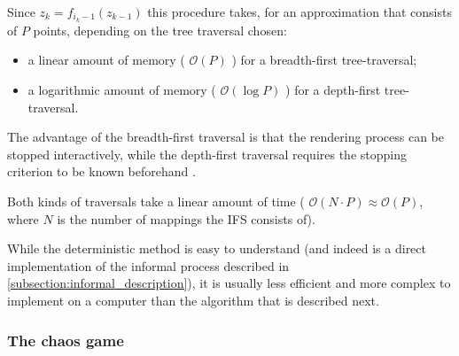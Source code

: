 \documentclass[11pt]{article}
\begin{document}
Since \(z_{k} = f_{i_k-1}(z_{k-1})\) this procedure takes, for an approximation that consists of \(P\) points, depending on the tree traversal chosen:

\begin{itemize}
\item a linear amount of memory ( \(\mathcal{O}(P)\) ) for a breadth-first tree-traversal;
\item a logarithmic amount of memory ( \(\mathcal{O}(\log{P})\) ) for a depth-first tree-traversal.
\end{itemize}


The advantage of the breadth-first traversal is that the rendering process can be stopped interactively,
while the depth-first traversal requires the stopping criterion to be known beforehand \cite{hepting1991rendering}.

Both kinds of traversals take a linear amount of time ( \(\mathcal{O}(N \cdot P) \approx \mathcal{O}(P)\), where \(N\) is the number of mappings the IFS consists of).

While the deterministic method is easy to understand (and indeed is a direct implementation of the informal process described in \autoref{subsection:informal_description}),
it is usually less efficient and more complex to implement on a computer than the algorithm that is described next.


\subsubsection{The chaos game}
\label{sec:orga58ca6e}
\label{subsection:chaos_game}
\end{document}
